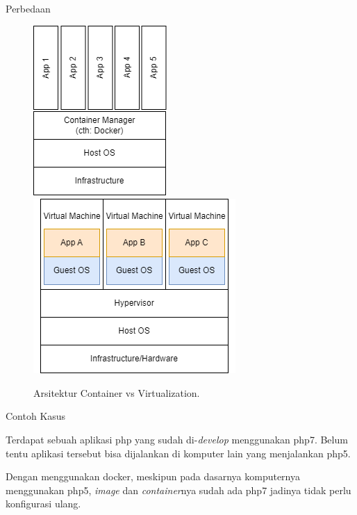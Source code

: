\documentclass{beamer}
\begin{document}
 	\begin{frame}{Perbedaan}
            \begin{figure}[h]
                \centering
	        \includegraphics[width=.35\textwidth]{ContainerDiagram.png}
	        \includegraphics[width=.5\textwidth]{VirtualizationDiagram.png}
	        \caption{Arsitektur Container vs Virtualization.}
	        \label{fig:ContainerDiagram}
	    \end{figure}
	\end{frame}

	\begin{frame}{Contoh Kasus}
            \item Terdapat sebuah aplikasi php yang sudah di-\textit{develop} menggunakan php7. Belum tentu aplikasi tersebut bisa dijalankan di komputer lain yang menjalankan php5.
            \item Dengan menggunakan docker, meskipun pada dasarnya komputernya menggunakan php5, \textit{image} dan \textit{container}nya sudah ada php7 jadinya tidak perlu konfigurasi ulang.
	\end{frame}
\end{document}
